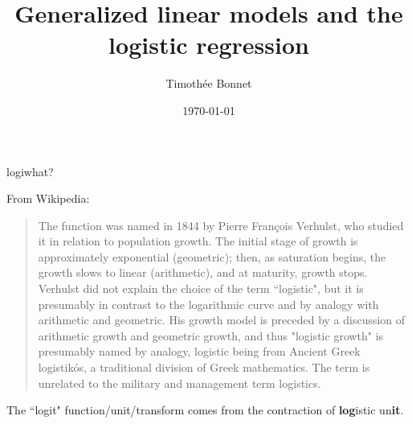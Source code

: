 \documentclass{beamer}\usepackage[]{graphicx}\usepackage[]{color}
\title[Logistic regression]{Generalized linear models and the logistic regression}
\author{Timoth\'ee Bonnet}
\institute{Thanks to BDSI for support!}
\date{\today}
\begin{document}




\begin{frame}{logiwhat?}

From Wikipedia:
\begin{quote}
The function was named in 1844 by Pierre François Verhulst, who studied it in relation to population growth. The initial stage of growth is approximately exponential (geometric); then, as saturation begins, the growth slows to linear (arithmetic), and at maturity, growth stops. Verhulst did not explain the choice of the term ``logistic", but it is presumably in contrast to the logarithmic curve and by analogy with arithmetic and geometric. His growth model is preceded by a discussion of arithmetic growth and geometric growth, and thus "logistic growth" is presumably named by analogy, logistic being from Ancient Greek logistikós, a traditional division of Greek mathematics. The term is unrelated to the military and management term logistics.
\end{quote}

The ``logit" function/unit/transform comes from the contraction of \textbf{log}istic un\textbf{it}.

\end{frame}


\begin{frame}{}
\maketitle

\end{frame}
\end{document}
